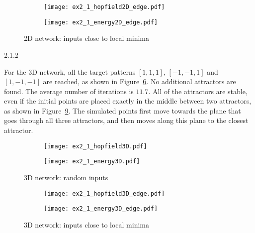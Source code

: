 \begin{figure}[ht!]
  \centering
  \begin{subfigure}{0.49\textwidth}
    \texttt{[image: ex2\_1\_hopfield2D\_edge.pdf]}
    \label{fig:ex2_1_hopfield2D_edge}
  \end{subfigure}
  \begin{subfigure}{0.49\textwidth}
    \texttt{[image: ex2\_1\_energy2D\_edge.pdf]}
    \label{fig:ex2_1_energy2D_edge}
  \end{subfigure}
  \caption{2D network: inputs close to local minima}
  \label{fig:ex2_1_2D_edge}
\end{figure}



\begin{task}{2.1.2}
\end{task}

For the 3D network, all the target patterns $[1, 1, 1]$, $[-1, -1, 1]$ and $[1, -1, -1]$ are
reached, as shown in Figure~\ref{fig:ex2_1_3D_random}. No additional attractors are found. The
average number of iterations is $11.7$. All of the attractors are stable, even if the initial points
are placed exactly in the middle between two attractors, as shown in Figure~\ref{fig:ex2_1_3D_edge}.
The simulated points first move towards the plane that goes through all three attractors, and then
moves along this plane to the closest attractor.

\begin{figure}[ht!]
  \centering
  \begin{subfigure}{0.49\textwidth}
    \texttt{[image: ex2\_1\_hopfield3D.pdf]}
    \label{fig:ex2_1_hopfield3D}
  \end{subfigure}
  \begin{subfigure}{0.49\textwidth}
    \texttt{[image: ex2\_1\_energy3D.pdf]}
    \label{fig:ex2_1_energy3D}
  \end{subfigure}
  \caption{3D network: random inputs}
  \label{fig:ex2_1_3D_random}
\end{figure}

\begin{figure}[ht!]
  \centering
  \begin{subfigure}{0.49\textwidth}
    \texttt{[image: ex2\_1\_hopfield3D\_edge.pdf]}
    \label{fig:ex2_1_hopfield3D_edge}
  \end{subfigure}
  \begin{subfigure}{0.49\textwidth}
    \texttt{[image: ex2\_1\_energy3D\_edge.pdf]}
    \label{fig:ex2_1_energy3D_edge}
  \end{subfigure}
  \caption{3D network: inputs close to local minima}
  \label{fig:ex2_1_3D_edge}
\end{figure}



